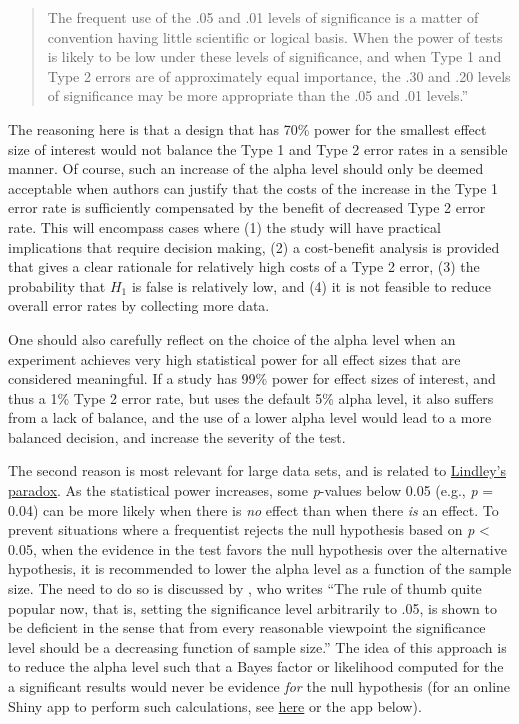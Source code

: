 \documentclass[
  oneside]{book}
\begin{document}
\begin{quote}
The frequent use of the .05 and .01 levels of significance is a matter of convention having little scientific or logical basis. When the power of tests is likely to be low under these levels of significance, and when Type 1 and Type 2 errors are of approximately equal importance, the .30 and .20 levels of significance may be more appropriate than the .05 and .01 levels.''
\end{quote}

The reasoning here is that a design that has 70\% power for the smallest effect size of interest would not balance the Type 1 and Type 2 error rates in a sensible manner. Of course, such an increase of the alpha level should only be deemed acceptable when authors can justify that the costs of the increase in the Type 1 error rate is sufficiently compensated by the benefit of decreased Type 2 error rate. This will encompass cases where (1) the study will have practical implications that require decision making, (2) a cost-benefit analysis is provided that gives a clear rationale for relatively high costs of a Type 2 error, (3) the probability that \(H_1\) is false is relatively low, and (4) it is not feasible to reduce overall error rates by collecting more data.

One should also carefully reflect on the choice of the alpha level when an experiment achieves very high statistical power for all effect sizes that are considered meaningful. If a study has 99\% power for effect sizes of interest, and thus a 1\% Type 2 error rate, but uses the default 5\% alpha level, it also suffers from a lack of balance, and the use of a lower alpha level would lead to a more balanced decision, and increase the severity of the test.

The second reason is most relevant for large data sets, and is related to \protect\hyperlink{lindley}{Lindley's paradox}. As the statistical power increases, some \emph{p}-values below 0.05 (e.g., \emph{p} = 0.04) can be more likely when there is \emph{no} effect than when there \emph{is} an effect. To prevent situations where a frequentist rejects the null hypothesis based on \emph{p} \textless{} 0.05, when the evidence in the test favors the null hypothesis over the alternative hypothesis, it is recommended to lower the alpha level as a function of the sample size. The need to do so is discussed by \citet{leamer_specification_1978}, who writes ``The rule of thumb quite popular now, that is, setting the significance level arbitrarily to .05, is shown to be deficient in the sense that from every reasonable viewpoint the significance level should be a decreasing function of sample size.'' The idea of this approach is to reduce the alpha level such that a Bayes factor or likelihood computed for the a significant results would never be evidence \emph{for} the null hypothesis (for an online Shiny app to perform such calculations, see \href{https://shiny.ieis.tue.nl/JustifyAlpha/}{here} or the app below).
\end{document}
